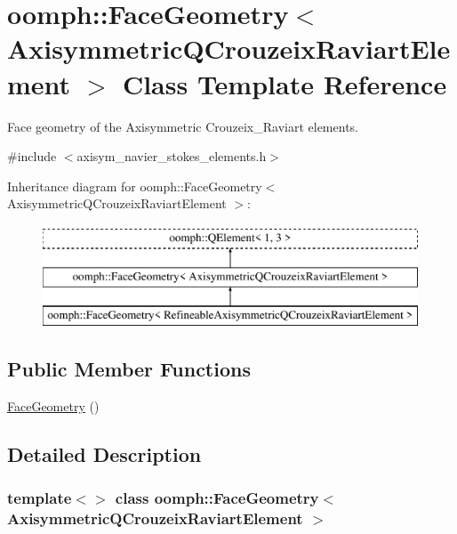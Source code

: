\hypertarget{classoomph_1_1FaceGeometry_3_01AxisymmetricQCrouzeixRaviartElement_01_4}{}\section{oomph\+:\+:Face\+Geometry$<$ Axisymmetric\+Q\+Crouzeix\+Raviart\+Element $>$ Class Template Reference}
\label{classoomph_1_1FaceGeometry_3_01AxisymmetricQCrouzeixRaviartElement_01_4}


Face geometry of the Axisymmetric Crouzeix\+\_\+\+Raviart elements.  




{\ttfamily \#include $<$axisym\+\_\+navier\+\_\+stokes\+\_\+elements.\+h$>$}

Inheritance diagram for oomph\+:\+:Face\+Geometry$<$ Axisymmetric\+Q\+Crouzeix\+Raviart\+Element $>$\+:\begin{figure}[H]
\begin{center}
\leavevmode
\includegraphics[height=3.000000cm]{classoomph_1_1FaceGeometry_3_01AxisymmetricQCrouzeixRaviartElement_01_4}
\end{center}
\end{figure}
\subsection*{Public Member Functions}
\begin{DoxyCompactItemize}
\item 
\hyperlink{classoomph_1_1FaceGeometry_3_01AxisymmetricQCrouzeixRaviartElement_01_4_a8be2de7574f28d6c0b5918c587723b3d}{Face\+Geometry} ()
\end{DoxyCompactItemize}


\subsection{Detailed Description}
\subsubsection*{template$<$$>$\newline
class oomph\+::\+Face\+Geometry$<$ Axisymmetric\+Q\+Crouzeix\+Raviart\+Element $>$}

